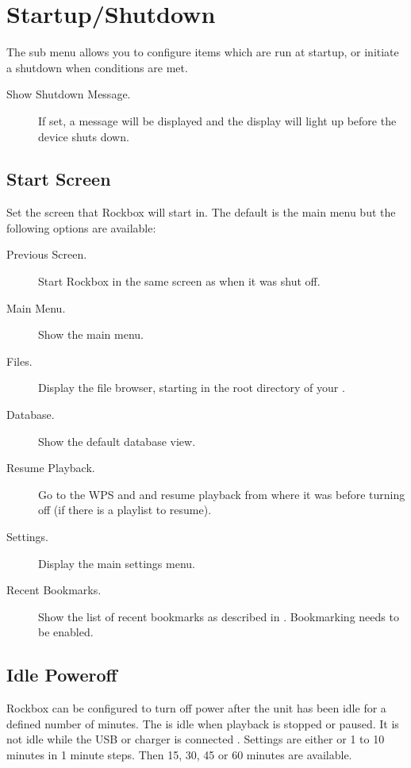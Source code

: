 
\section{\label{ref:StartupShutdownOptions}Startup/Shutdown}

The  sub menu allows you to configure items which
are run at startup, or initiate a shutdown when conditions are met.

\begin{description}
    \item[Show Shutdown Message.] If set, a message will be displayed and the display
    will light up before the device shuts down.
\end{description}

\subsection{Start Screen}
  Set the screen that Rockbox will start in. The default is the main menu but
  the following options are available:
  \begin{description}
    \item[Previous Screen.] Start Rockbox in the same screen as when it was
    shut off.
    \item[Main Menu.] Show the main menu.
    \item[Files.] Display the file browser, starting in the root directory of
    your \dap.
    \item[Database.] Show the default database view.
    \item[Resume Playback.] Go to the WPS and and resume playback from where
    it was before turning off (if there is a playlist to resume).
    \item[Settings.] Display the main settings menu.
    \item[Recent Bookmarks.] Show the list of recent bookmarks as
      described in . Bookmarking needs
      to be enabled.
  \end{description}

\subsection{\label{ref:IdlePoweroffSetting}Idle Poweroff}
  Rockbox can be configured to turn off power after the unit has been idle for
  a defined number of minutes. The \dap{} is idle when playback is stopped or
  paused. It is not idle while the USB or charger is connected
  .
  Settings are either  or 1 to 10 minutes in 1 minute steps. Then
  15, 30, 45 or 60 minutes are available.

